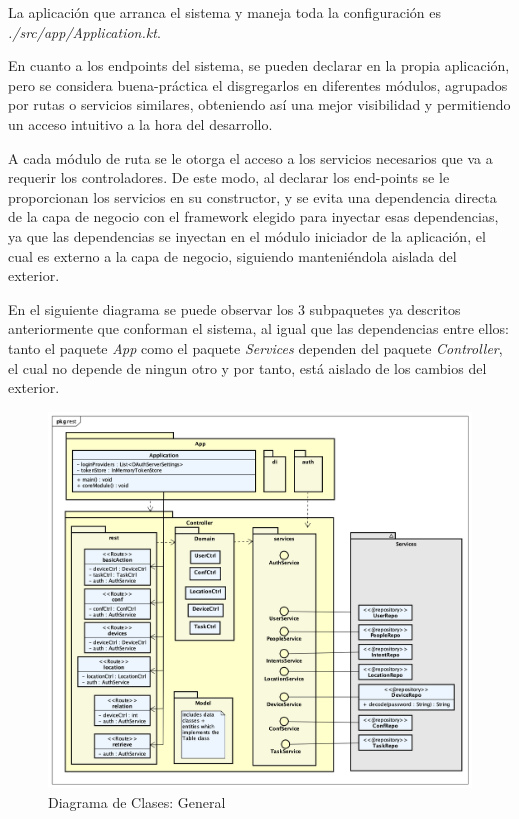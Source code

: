     La aplicación que arranca el sistema y maneja toda la configuración es \textit{./src/app/Application.kt}.
    
    En cuanto a los endpoints del sistema, se pueden declarar en la propia aplicación, pero se considera buena-práctica el disgregarlos en diferentes módulos, agrupados por rutas o servicios similares, obteniendo así una mejor visibilidad y permitiendo un acceso intuitivo a la hora del desarrollo.
    
    A cada módulo de ruta se le otorga el acceso a los servicios necesarios que va a requerir los controladores. De este modo, al declarar los end-points se le proporcionan los servicios en su constructor, y se evita una dependencia directa de la capa de negocio con el framework elegido para inyectar esas dependencias, ya que las dependencias se inyectan en el módulo iniciador de la aplicación, el cual es externo a la capa de negocio, siguiendo manteniéndola aislada del exterior.
    
    En el siguiente diagrama se puede observar los 3 subpaquetes ya descritos anteriormente que conforman el sistema, al igual que las dependencias entre ellos: tanto el paquete \textit{App} como el paquete \textit{Services} dependen del paquete \textit{Controller}, el cual no depende de ningun otro y por tanto, está aislado de los cambios del exterior.
    
    \begin{figure}[H]
    \centering
    \includegraphics[width=14cm]{./img/arch/back/diag.class.2.png}
    \caption{Diagrama de Clases: General}
    \label{fig:diagram.app}
\end{figure}

